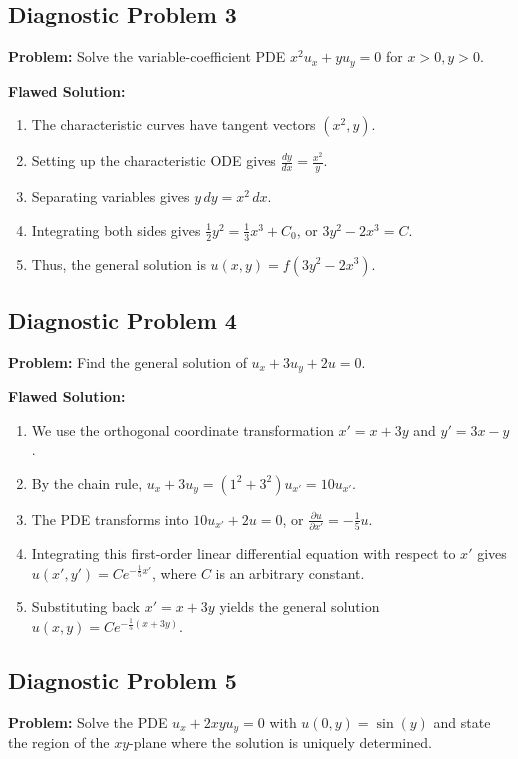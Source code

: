 \documentclass[11pt]{article}
\begin{document}
\subsection*{Diagnostic Problem 3}
\textbf{Problem:} Solve the variable-coefficient PDE $x^2 u_x + y u_y = 0$ for $x > 0, y > 0$.

\noindent\textbf{Flawed Solution:}
\begin{enumerate}
    \item The characteristic curves have tangent vectors $(x^2, y)$.
    \item Setting up the characteristic ODE gives $\frac{dy}{dx} = \frac{x^2}{y}$.
    \item Separating variables gives $y\,dy = x^2\,dx$.
    \item Integrating both sides gives $\frac{1}{2}y^2 = \frac{1}{3}x^3 + C_0$, or $3y^2 - 2x^3 = C$.
    \item Thus, the general solution is $u(x, y) = f(3y^2 - 2x^3)$.
\end{enumerate}

\subsection*{Diagnostic Problem 4}
\textbf{Problem:} Find the general solution of $u_x + 3u_y + 2u = 0$.

\noindent\textbf{Flawed Solution:}
\begin{enumerate}
    \item We use the orthogonal coordinate transformation $x' = x + 3y$ and $y' = 3x - y$.
    \item By the chain rule, $u_x + 3u_y = (1^2 + 3^2)u_{x'} = 10u_{x'}$.
    \item The PDE transforms into $10u_{x'} + 2u = 0$, or $\frac{\partial u}{\partial x'} = -\frac{1}{5}u$.
    \item Integrating this first-order linear differential equation with respect to $x'$ gives $u(x', y') = C e^{-\frac{1}{5}x'}$, where $C$ is an arbitrary constant.
    \item Substituting back $x' = x + 3y$ yields the general solution $u(x, y) = C e^{-\frac{1}{5}(x + 3y)}$.
\end{enumerate}

\subsection*{Diagnostic Problem 5}
\textbf{Problem:} Solve the PDE $u_x + 2xy u_y = 0$ with $u(0, y) = \sin(y)$ and state the region of the $xy$-plane where the solution is uniquely determined.
\end{document}
